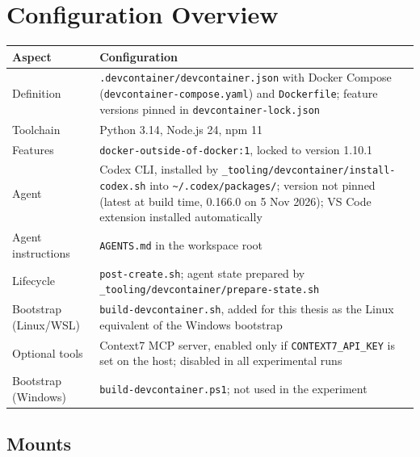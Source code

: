 \documentclass[11pt,a4paper]{article}
\newcommand{\fpath}[1]{\texttt{#1}}
\begin{document}
\section{Configuration Overview}

\begin{table}[H]
\small
\begin{tabularx}{\linewidth}{@{}>{\raggedright\arraybackslash}p{3.6cm}L@{}}
\toprule
\textbf{Aspect} & \textbf{Configuration} \\
\midrule
Definition & \fpath{.devcontainer/devcontainer.json} with Docker Compose (\fpath{devcontainer-compose.yaml}) and \fpath{Dockerfile}; feature versions pinned in \fpath{devcontainer-lock.json} \\
Toolchain & Python 3.14, Node.js 24, npm 11 \\
Features & \texttt{docker-outside-of-docker:1}, locked to version 1.10.1 \\
Agent & Codex CLI, installed by \fpath{\_tooling/devcontainer/install-codex.sh} into \fpath{\textasciitilde/.codex/packages/}; version not pinned (latest at build time, 0.166.0 on 5 Nov 2026); VS Code extension installed automatically \\
Agent instructions & \fpath{AGENTS.md} in the workspace root \\
Lifecycle & \fpath{post-create.sh}; agent state prepared by \fpath{\_tooling/devcontainer/prepare-state.sh} \\
Bootstrap (Linux/WSL) & \fpath{build-devcontainer.sh}, added for this thesis as the Linux equivalent of the Windows bootstrap \\
Optional tools & Context7 MCP server, enabled only if \texttt{CONTEXT7\_API\_KEY} is set on the host; disabled in all experimental runs \\
Bootstrap (Windows) & \fpath{build-devcontainer.ps1}; not used in the experiment \\
\bottomrule
\end{tabularx}
\end{table}

\subsection{Mounts}
\end{document}
